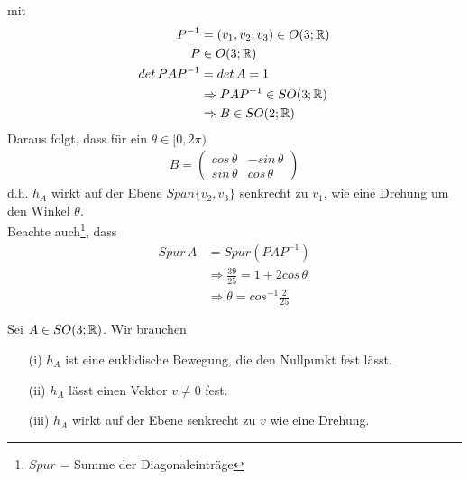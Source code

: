 mit 
\begin{align}
P^{-1} &= (v_1, v_2, v_3) \in O(3; \mathbb{R}) \\
P &\in O(3; \mathbb{R}) \\
det\,PAP^{-1} &= det\, A = 1 \\
&\Rightarrow PAP^{-1} \in SO(3; \mathbb{R}) \\
&\Rightarrow B \in SO(2; \mathbb{R})
\end{align}
Daraus folgt, dass für ein $\theta \in [0, 2\pi)$
\begin{align}
B = \begin{pmatrix} cos\, \theta & -sin\, \theta \\ sin\, \theta & cos\, \theta \end{pmatrix}
\end{align}
d.h. $h_A$ wirkt auf der Ebene $Span\{v_2, v_3\}$ senkrecht zu $v_1$, wie eine Drehung um den Winkel $\theta$.\\
Beachte auch\footnote{$Spur$ = Summe der Diagonaleinträge}, dass 
\begin{align}
Spur\, A &= Spur(PAP^{-1}) \\
&\Rightarrow \frac{39}{25} = 1 + 2 cos\, \theta \\
&\Rightarrow \theta = cos^{-1} \frac{2}{25}
\end{align}

Sei $A \in SO(3; \mathbb{R})$. Wir brauchen
\begin{itemize}
\item[(i)] $h_A$ ist eine euklidische Bewegung, die den Nullpunkt fest lässt.
\item[(ii)] $h_A$ lässt einen Vektor $v\neq 0$ fest.
\item[(iii)] $h_A$ wirkt auf der Ebene senkrecht zu $v$ wie eine Drehung.
\end{itemize}

